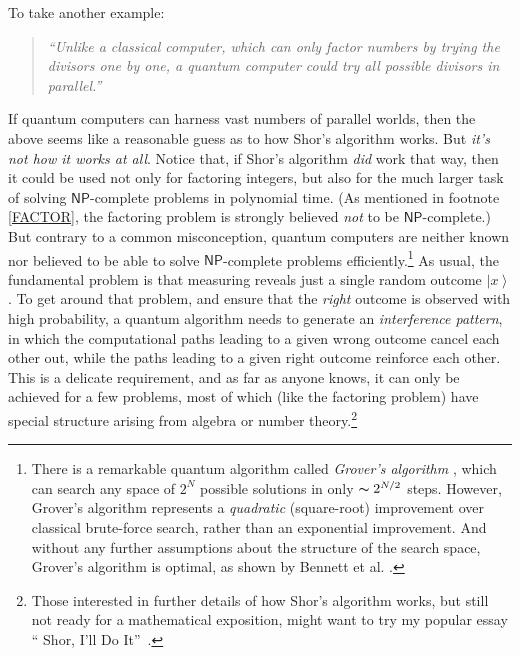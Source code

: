 \documentclass[12pt,onecolumn]{article}%
\begin{document}
To take another example:

\begin{quotation}
\noindent\textit{\textquotedblleft Unlike a classical computer, which can only
factor numbers by trying the divisors one by one, a quantum computer could try
all possible divisors in parallel.\textquotedblright\ }
\end{quotation}

If quantum computers can harness vast numbers of parallel worlds, then the
above seems like a reasonable guess as to how Shor's algorithm works. But
\textit{it's not how it works at all}. Notice that, if Shor's algorithm
\textit{did} work that way, then it could be used not only for factoring
integers, but also for the much larger task of solving $\mathsf{NP}$-complete
problems in polynomial time. (As mentioned in footnote \ref{FACTOR}, the
factoring problem is strongly believed \textit{not} to be $\mathsf{NP}%
$-complete.) But contrary to a common misconception, quantum computers are
neither known nor believed to be able to solve $\mathsf{NP}$-complete problems
efficiently.\footnote{There is a remarkable quantum algorithm called
\textit{Grover's algorithm} \cite{grover}, which can search any space of
$2^{N}$ possible solutions in only $\thicksim2^{N/2}$ steps. However,
Grover's algorithm represents a \textit{quadratic} (square-root) improvement
over classical brute-force search, rather than an exponential improvement.
 And without any further assumptions about the structure of the search space,
Grover's algorithm is optimal, as shown by Bennett et al. \cite{bbbv}.} As
usual, the fundamental problem is that measuring reveals just a single random
outcome $\left\vert x\right\rangle $. To get around that problem, and ensure
that the \textit{right} outcome is observed with high probability, a quantum
algorithm needs to generate an \textit{interference pattern}, in which the
computational paths leading to a given wrong outcome cancel each other out,
while the paths leading to a given right outcome reinforce each other. This
is a delicate requirement, and as far as anyone knows, it can only be achieved
for a few problems, most of which (like the factoring problem) have special
structure arising from algebra or number theory.\footnote{Those interested in
further details of how Shor's algorithm works, but still not ready for a
mathematical exposition, might want to try my popular essay \textquotedblleft
Shor, I'll Do It\textquotedblright\  \cite{aar:shor}.}
\end{document}
